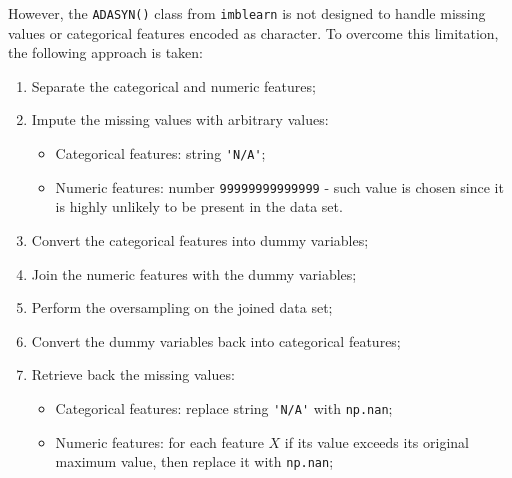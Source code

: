 However, the \lstinline{ADASYN()} class from \lstinline{imblearn} is not designed to handle missing values or categorical features encoded as character. To overcome this limitation, the following approach is taken:
\begin{enumerate}\setlength\itemsep{0em} 
\item Separate the categorical and numeric features;
\item Impute the missing values with arbitrary values:
\begin{itemize}
\item Categorical features: string \lstinline{'N/A'};
\item Numeric features: number \lstinline{99999999999999} - such value is chosen since it is highly unlikely to be present in the data set.
\end{itemize}
\item Convert the categorical features into dummy variables;
\item Join the numeric features with the dummy variables;
\item Perform the oversampling on the joined data set;
\item Convert the dummy variables back into categorical features;
\item Retrieve back the missing values:
\begin{itemize}
\item Categorical features: replace string \lstinline{'N/A'} with \lstinline{np.nan};
\item Numeric features: for each feature $X$ if its value exceeds its original maximum value, then replace it with \lstinline{np.nan};
\end{itemize}
\end{enumerate}


